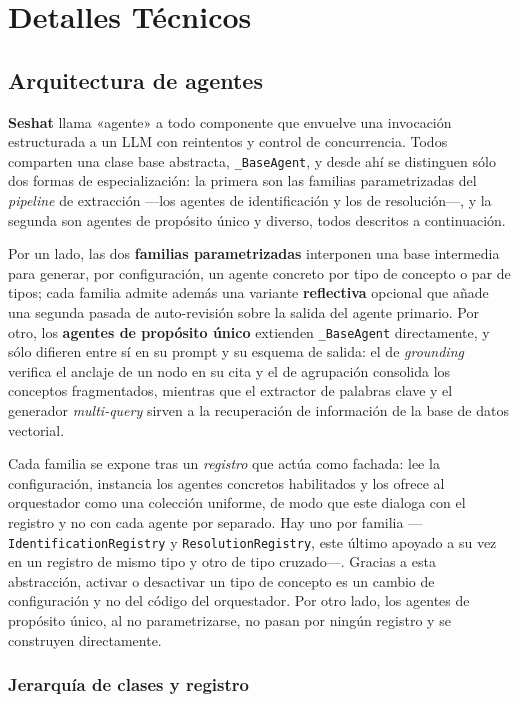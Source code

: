 \chapter{Detalles Técnicos}
\label{anx:tecnico}

\section{Arquitectura de agentes}

\textbf{Seshat} llama «agente» a todo componente que envuelve una invocación estructurada a un
\ac{LLM} con reintentos y control de concurrencia. Todos comparten una clase base abstracta,
\texttt{\_BaseAgent}, y desde ahí se distinguen sólo dos formas de especialización: la primera son
las familias parametrizadas del \textit{pipeline} de extracción —los agentes de identificación y
los de resolución—, y la segunda son agentes de propósito único y diverso, todos descritos a
continuación.

Por un lado, las dos \textbf{familias parametrizadas} interponen una base intermedia para generar,
por configuración, un agente concreto por tipo de concepto o par de tipos; cada familia admite
además una variante \textbf{reflectiva} opcional que añade una segunda pasada de auto-revisión
sobre la  salida del agente primario. Por otro, los \textbf{agentes de propósito único} extienden
\texttt{\_BaseAgent} directamente, y sólo difieren entre sí en su prompt y su esquema de salida:
el de \textit{grounding} verifica el anclaje de un nodo en su cita y el de agrupación consolida
los conceptos fragmentados, mientras que el extractor de palabras clave y el generador
\textit{multi-query} sirven a la recuperación de información de la base de datos vectorial.

Cada familia se expone tras un \textit{registro} que actúa como fachada: lee la configuración,
instancia los agentes concretos habilitados y los ofrece al orquestador como una colección
uniforme, de modo que este dialoga con el registro y no con cada agente por separado. Hay uno
por familia —\texttt{IdentificationRegistry} y \texttt{ResolutionRegistry}, este último apoyado
a su vez en un registro de mismo tipo y otro de tipo cruzado—. Gracias a esta abstracción, activar
o desactivar un tipo de concepto es un cambio de configuración y no del código del orquestador.
Por otro lado, los agentes de propósito único, al no parametrizarse, no pasan por ningún registro
y se construyen directamente.

\subsection{Jerarquía de clases y registro}
\label{anx:jerarquia-agentes}

